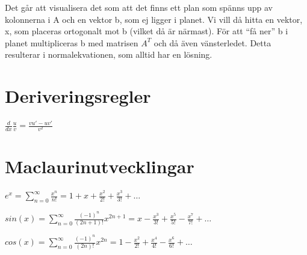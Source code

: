 \documentclass[12pt,a4paper]{article}
\begin{document}
Det går att visualisera det som att det finns ett plan som spänns upp av kolonnerna i A och en vektor b, som ej ligger i planet. Vi vill då hitta en vektor, x, som placeras ortogonalt mot b (vilket då är närmast). För att ``få ner'' b i planet multipliceras b med matrisen $A^T$ och då även vänsterledet. Detta resulterar i normalekvationen, som alltid har en lösning.

\section{Deriveringsregler}
$\frac{d}{dx}\frac{u}{v} = \frac{vu'-uv'}{v^2}$

\section{Maclaurinutvecklingar}

$ e^x = \sum_{n=0}^{\infty} \frac{x^n}{n!} = 1 + x + \frac{x^2}{2!} + \frac{x^3}{3!} + \ldots $

$ sin(x) = \sum_{n=0}^{\infty} \frac{(-1)^n}{(2n+1)!} x^{2n+1} = x - \frac{x^3}{3!} + \frac{x^5}{5!} - \frac{x^7}{7!} + \ldots$

$ cos(x) = \sum_{n=0}^{\infty} \frac{(-1)^n}{(2n)!} x^{2n} = 1 - \frac{x^2}{2!} + \frac{x^4}{4!} - \frac{x^6}{6!} + \ldots$
\end{document}
